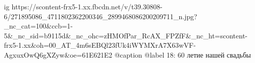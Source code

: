  
 
 
 
 

\ifcmt
  ig https://scontent-frx5-1.xx.fbcdn.net/v/t39.30808-6/271895086_4711802362200346_2899468086200209711_n.jpg?_nc_cat=100&ccb=1-5&_nc_sid=b9115d&_nc_ohc=zHMOfPar_RcAX_FPZfF&_nc_ht=scontent-frx5-1.xx&oh=00_AT_4m6sEBQl23fUk4iWYMXrA7X63wVF-AgxuxOwQ6gXZyw&oe=61E621E2
  @caption @label 18: 60 летие нашей свадьбы
\fi
